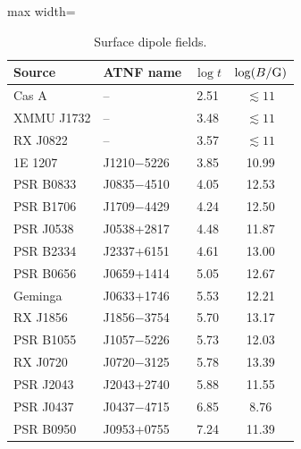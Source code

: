 \documentclass[11pt,a4paper]{article}
\begin{document}
\begin{table}[h]
\centering
\caption{Surface dipole fields.}\label{tab:fields}
\begin{adjustbox}{max width=\linewidth}
\begin{tabular}{llcc}
\toprule
Source & ATNF name & $\log t$ & $\log(B/{\rm G})$\\
\midrule
Cas A & -- & 2.51 & $\lesssim11$\\
XMMU J1732 & -- & 3.48 & $\lesssim11$\\
RX J0822 & -- & 3.57 & $\lesssim11$\\
1E 1207 & J1210$-$5226 & 3.85 & 10.99\\
PSR B0833 & J0835$-$4510 & 4.05 & 12.53\\
PSR B1706 & J1709$-$4429 & 4.24 & 12.50\\
PSR J0538 & J0538+2817 & 4.48 & 11.87\\
PSR B2334 & J2337+6151 & 4.61 & 13.00\\
PSR B0656 & J0659+1414 & 5.05 & 12.67\\
Geminga & J0633+1746 & 5.53 & 12.21\\
RX J1856 & J1856$-$3754 & 5.70 & 13.17\\
PSR B1055 & J1057$-$5226 & 5.73 & 12.03\\
RX J0720 & J0720$-$3125 & 5.78 & 13.39\\
PSR J2043 & J2043+2740 & 5.88 & 11.55\\
PSR J0437 & J0437$-$4715 & 6.85 & 8.76\\
PSR B0950 & J0953+0755 & 7.24 & 11.39\\
\bottomrule
\end{tabular}
\end{adjustbox}
\end{table}
\end{document}
